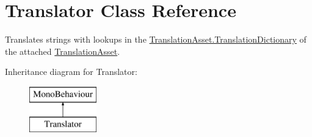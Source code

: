 \hypertarget{class_translator}{}\section{Translator Class Reference}
\label{class_translator}


Translates strings with lookups in the \hyperlink{class_translation_asset_a313f9943f1dc9f48fb45633452093f1b}{Translation\+Asset.\+Translation\+Dictionary} of the attached \hyperlink{class_translation_asset}{Translation\+Asset}.  


Inheritance diagram for Translator\+:\begin{figure}[H]
\begin{center}
\leavevmode
\includegraphics[height=2.000000cm]{class_translator}
\end{center}
\end{figure}
